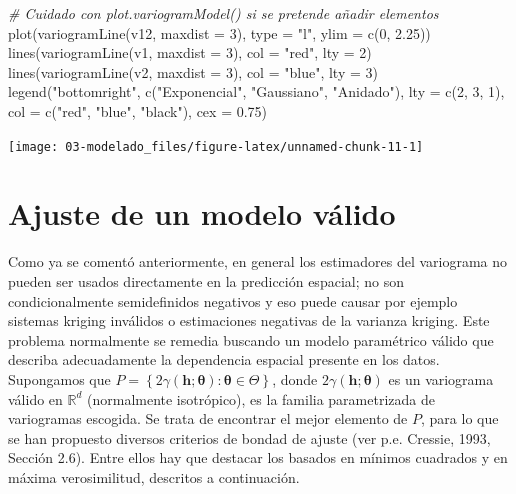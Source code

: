 \documentclass[
  spanish,
]{book}
\newenvironment{Shaded}{\begin{snugshade}}{\end{snugshade}}
\newcommand{\AttributeTok}[1]{\textcolor[rgb]{0.77,0.63,0.00}{#1}}
\newcommand{\CommentTok}[1]{\textcolor[rgb]{0.56,0.35,0.01}{\textit{#1}}}
\newcommand{\DecValTok}[1]{\textcolor[rgb]{0.00,0.00,0.81}{#1}}
\newcommand{\FloatTok}[1]{\textcolor[rgb]{0.00,0.00,0.81}{#1}}
\newcommand{\FunctionTok}[1]{\textcolor[rgb]{0.00,0.00,0.00}{#1}}
\newcommand{\NormalTok}[1]{#1}
\newcommand{\StringTok}[1]{\textcolor[rgb]{0.31,0.60,0.02}{#1}}
\theoremstyle{break}
\theoremstyle{definition}
\theoremstyle{definition}
\theoremstyle{definition}
\theoremstyle{definition}
\theoremstyle{remark}
\begin{document}
\begin{Shaded}
\begin{Highlighting}[]
\CommentTok{\# Cuidado con plot.variogramModel() si se pretende añadir elementos}
\FunctionTok{plot}\NormalTok{(}\FunctionTok{variogramLine}\NormalTok{(v12, }\AttributeTok{maxdist =} \DecValTok{3}\NormalTok{), }\AttributeTok{type =} \StringTok{"l"}\NormalTok{, }\AttributeTok{ylim =} \FunctionTok{c}\NormalTok{(}\DecValTok{0}\NormalTok{, }\FloatTok{2.25}\NormalTok{))}
\FunctionTok{lines}\NormalTok{(}\FunctionTok{variogramLine}\NormalTok{(v1, }\AttributeTok{maxdist =} \DecValTok{3}\NormalTok{), }\AttributeTok{col =} \StringTok{"red"}\NormalTok{, }\AttributeTok{lty =} \DecValTok{2}\NormalTok{)}
\FunctionTok{lines}\NormalTok{(}\FunctionTok{variogramLine}\NormalTok{(v2, }\AttributeTok{maxdist =} \DecValTok{3}\NormalTok{), }\AttributeTok{col =} \StringTok{"blue"}\NormalTok{, }\AttributeTok{lty =} \DecValTok{3}\NormalTok{)}
\FunctionTok{legend}\NormalTok{(}\StringTok{"bottomright"}\NormalTok{, }\FunctionTok{c}\NormalTok{(}\StringTok{"Exponencial"}\NormalTok{, }\StringTok{"Gaussiano"}\NormalTok{, }\StringTok{"Anidado"}\NormalTok{), }\AttributeTok{lty =} \FunctionTok{c}\NormalTok{(}\DecValTok{2}\NormalTok{, }\DecValTok{3}\NormalTok{, }\DecValTok{1}\NormalTok{), }
       \AttributeTok{col =} \FunctionTok{c}\NormalTok{(}\StringTok{"red"}\NormalTok{, }\StringTok{"blue"}\NormalTok{, }\StringTok{"black"}\NormalTok{), }\AttributeTok{cex =} \FloatTok{0.75}\NormalTok{)}
\end{Highlighting}
\end{Shaded}

\begin{center}\texttt{[image: 03-modelado\_files/figure-latex/unnamed-chunk-11-1]} \end{center}

\hypertarget{ajuste-variog}{%
\section{Ajuste de un modelo válido}\label{ajuste-variog}}

Como ya se comentó anteriormente, en general los estimadores del variograma no pueden ser usados directamente en la predicción espacial;
no son condicionalmente semidefinidos negativos y eso puede causar por ejemplo sistemas kriging inválidos o estimaciones negativas de la varianza kriging.
Este problema normalmente se remedia buscando un modelo paramétrico válido que describa adecuadamente la dependencia espacial presente en los datos.
Supongamos que \(P=\left\{ 2\gamma(\mathbf{h};\boldsymbol{\theta}):\boldsymbol{\theta}\in \Theta \right\}\), donde \(2\gamma(\mathbf{h};\boldsymbol{\theta})\) es un variograma válido en \(\mathbb{R}^{d}\) (normalmente isotrópico), es la familia parametrizada de variogramas escogida.
Se trata de encontrar el mejor elemento de \(P\), para lo que se han propuesto diversos criterios de bondad de ajuste (ver p.e. Cressie, 1993, Sección 2.6).
Entre ellos hay que destacar los basados en mínimos cuadrados y en máxima verosimilitud, descritos a continuación.
\end{document}
